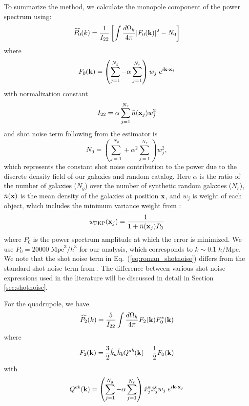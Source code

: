 To summarize the method, we calculate the 
monopole component of the power spectrum using: 
\begin{equation}\label{eq:roman_p0k}
\widehat{P_0}(k) = \frac{1}{I_{22}} \left[ \int \frac{d\Omega_k}{4 \pi} |F_0({\bf k})|^2 - N_0 \right]
\end{equation}
where 
\begin{equation}
F_0({\bf k}) = \left( \sum_{j = 1}^{N_g} - \alpha \sum_{j=1}^{N_r} \right) w_j\;e^{i {\bf k}\cdot{\bf x}_j}
\end{equation}
with normalization constant
\begin{equation} \label{eq:i22}
I_{22} = \alpha \sum^{N_r}_{j=1} \bar{n}({\bf x}_j)w_j^2
\end{equation}
and shot noise term following from the estimator is \citep{Scoccimarro:2015aa}
\begin{equation} \label{eq:roman_shotnoise}
N_0 = \left( \sum_{j = 1}^{N_g} + \alpha^2 \sum_{j=1}^{N_r} \right) w_j^2, 
\end{equation}
which represents the constant shot noise contribution to the power due to 
the discrete density field of our galaxies and random catalog. Here $\alpha$ is the ratio of the 
number of galaxies ($N_g$) over the number of synthetic random galaxies 
($N_r$), $\bar{n}({\bf x})$ is the mean density of the galaxies at position 
${\bf x}$, and $w_j$ is weight of each object, which includes the minimum 
variance weight from \cite{Feldman:1994aa}: 
\begin{equation}
w_{\mathrm{FKP}} ({\bf x}_j) = \frac{1}{1+\bar{n}({\bf x}_j) P_0}
\end{equation}
where $P_0$ is the power spectrum amplitude at which the error is minimized. 
We use $P_0 = 20000\; \mathrm{Mpc}^3/h^3$ for our analysis, which corresponds 
to $k \sim 0.1\; h/\mathrm{Mpc}$. We note that the shot noise term in 
Eq.~(\ref{eq:roman_shotnoise}) differs from the standard shot noise term from
\cite{Feldman:1994aa}. The difference between various shot noise expressions used in the literature  
will be discussed in detail in Section \ref{sec:shotnoise}. 

For the quadrupole, we have 
\begin{equation}\label{eq:roman_p2k}
\widehat{P_2}(k) = \frac{5}{I_{22}} \int \frac{d\Omega_k}{4 \pi} F_2({\bf k}) F_0^*({\bf k})
\end{equation}
where 
\begin{equation}
F_2({\bf k}) = \frac{3}{2}\hat{k}_a\hat{k}_b Q^{ab}({\bf k}) - \frac{1}{2} F_0({\bf k})
\end{equation}
with 
\begin{equation}
Q^{ab}({\bf k}) = \left( \sum_{j = 1}^{N_g} - \alpha \sum_{j=1}^{N_r} \right) \hat{x}_j^a\hat{x}_j^b w_j \;e^{i {\bf k}\cdot{\bf x}_j}
\end{equation}

